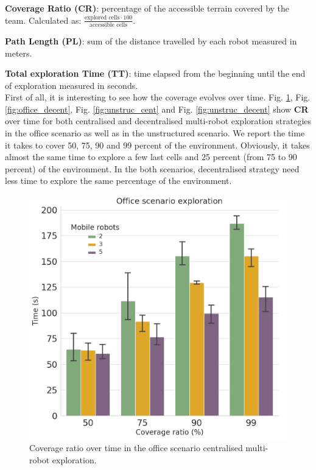 \documentclass[letterpaper, 10 pt, conference]{ieeeconf}  %
\begin{document}
\textbf{Coverage Ratio (CR)}: percentage of the accessible terrain covered by the team. Calculated as:  \( \frac{\text{explored cells} \cdot 100}{\text{accessible cells}} \).

\textbf{Path Length (PL)}: sum of the distance travelled by each robot measured in meters.

\textbf{Total exploration Time (TT)}: time elapsed from the beginning until the end of exploration measured in seconds.\\

First of all, it is interesting to see how the coverage evolves over time. Fig. \ref{fig:office_cent}, Fig. \ref{fig:office_decent}, Fig. \ref{fig:unstruc_cent} and Fig. \ref{fig:unstruc_decent} show \textbf{CR} over time for both centralised and decentralised multi-robot exploration strategies in the office scenario as well as in the unstructured scenario. We report the time it takes to cover 50, 75, 90 and 99 percent of the environment. Obviously, it takes almost the same time to explore a few last cells and 25 percent (from 75 to 90 percent) of the environment. In the both scenarios, decentralised strategy need less time to explore the same percentage of the environment.  

\begin{figure}[b!]
	\centering\includegraphics[width=0.7\columnwidth]{office_coverage_cent.png}
	\caption{Coverage ratio over time in the office scenario centralised multi-robot exploration.}
	\label{fig:office_cent}
\end{figure}
\end{document}
